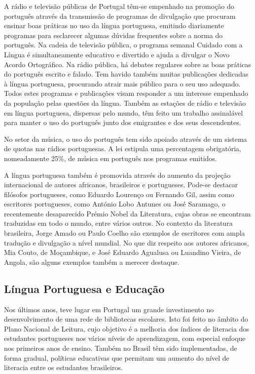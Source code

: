\begin{multicols}{2}
A rádio e televisão públicas de Portugal têm-se empenhado na promoção do português através da transmissão de programas de divulgação
que procuram ensinar boas práticas no uso da língua portuguesa, emitindo diariamente programas para esclarecer algumas dúvidas frequentes sobre a norma do português. 
Na cadeia de televisão pública, o programa semanal Cuidado com a Língua é simultaneamente educativo e divertido e ajuda a divulgar o Novo Acordo Ortográfico. 
Na rádio pública, há debates regulares sobre as boas práticas do português escrito e falado.
Tem havido também muitas pu\-bli\-ca\-ções dedicadas à língua portuguesa, procurando atrair mais público para o seu uso adequado. 
Todos estes programas e publicações visam responder a um interesse empenhado da população pelas questões da língua. 
Também as estações de rádio e televisão em língua portuguesa, dispersas pelo mundo, têm feito um trabalho assinalável 
para manter o uso do português junto dos emigrantes e dos seus descendentes.


No setor da música, o uso do português tem sido apoiado através de um sistema de quotas nas rádios portuguesas. 
A lei estipula uma per\-cen\-ta\-gem obrigatória, nomeadamente 25\%, de música em português nos programas emitidos. 

A língua portuguesa também é promovida através do aumento da projeção internacional de autores africanos, brasileiros e portugueses. 
Pode-se destacar filósofos portugueses, como Eduardo Lourenço ou Fernando Gil, 
assim como escritores portugueses, como António Lobo Antunes ou José Saramago, o recentemente desaparecido Prémio Nobel
da Literatura, cujas obras se encontram traduzidas em todo o mundo, entre vários outros. 
No contexto da literatura brasileira, Jorge Amado ou Paulo Coelho são exemplos de escritores com ampla tradução e divulgação a nível mundial. 
No que diz respeito aos autores africanos, Mia Couto, de Moçambique, e José Eduardo Agualusa ou Luandino Vieira, de Angola, são alguns exemplos também a 
merecer destaque.



\subsection{Língua Portuguesa e Educação}

Nos últimos anos, teve lugar em Portugal um grande investimento no desenvolvimento de uma rede de bibliotecas escolares. 
Isto foi feito no âmbito do Plano Nacional de Leitura, cujo objetivo é a melhoria dos índices de literacia dos estudantes portugueses 
nos vários níveis de aprendizagem, com especial enfoque nos primeiros anos de ensino. 
Também no Brasil têm sido implementadas, de forma gradual, políticas educativas que permitam um aumento 
do nível de literacia entre os estudantes brasileiros.


\end{multicols}
